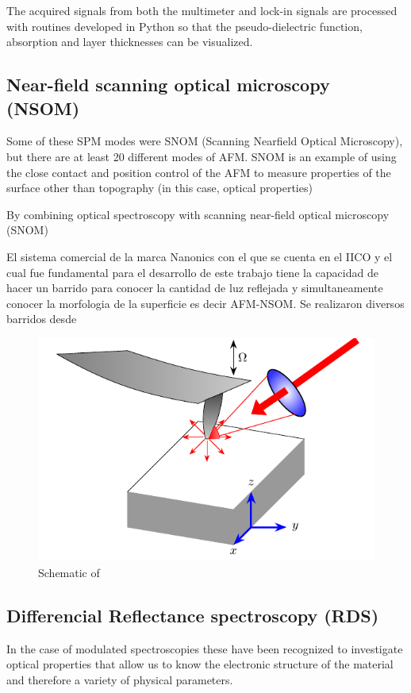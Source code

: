 The acquired signals from both the multimeter and lock-in signals are processed with routines developed in Python so that the pseudo-dielectric function, absorption and layer thicknesses can be visualized. 

\subsection{Near-field scanning optical microscopy (NSOM)}
\vspace{-1cm}
Some of these SPM modes were SNOM (Scanning Nearfield Optical
Microscopy), but there are at least 20 different modes of AFM. SNOM is an example of
using the close contact and position control of the AFM to measure properties of the
surface other than topography (in this case, optical properties)

By combining optical spectroscopy with scanning near-ﬁeld optical microscopy
(SNOM)

El sistema comercial de la marca Nanonics con el que se cuenta en el IICO  y el cual fue fundamental para el desarrollo de este trabajo tiene la capacidad de hacer un barrido para conocer la cantidad de luz reflejada y simultaneamente conocer la morfologia de la superficie es decir AFM-NSOM. Se realizaron diversos barridos desde %

\begin{figure}[H]
	\centering
	\includegraphics[width=0.7\linewidth]{FIGURES/Characterization_techniques/NSOM-setup}
	\caption{Schematic of }
	\label{fig:NSOM:SETUP}
\end{figure}





\subsection{Differencial Reflectance spectroscopy (RDS)}
\vspace{-1cm}
In the case of modulated spectroscopies these have been recognized to investigate optical properties that allow us to know the electronic structure of the material and therefore a variety of physical parameters. 

